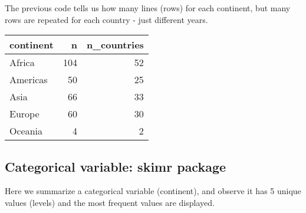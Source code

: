 \documentclass[]{book}
\newenvironment{Shaded}{\begin{snugshade}}{\end{snugshade}}
\newcommand{\KeywordTok}[1]{\textcolor[rgb]{0.13,0.29,0.53}{\textbf{#1}}}
\newcommand{\DataTypeTok}[1]{\textcolor[rgb]{0.13,0.29,0.53}{#1}}
\newcommand{\DecValTok}[1]{\textcolor[rgb]{0.00,0.00,0.81}{#1}}
\newcommand{\StringTok}[1]{\textcolor[rgb]{0.31,0.60,0.02}{#1}}
\newcommand{\OperatorTok}[1]{\textcolor[rgb]{0.81,0.36,0.00}{\textbf{#1}}}
\newcommand{\NormalTok}[1]{#1}
\begin{document}
The previous code tells us how many lines (rows) for each continent, but
many rows are repeated for each country - just different years.

\begin{Shaded}
\end{Shaded}

\begin{tabular}{l|r|r}
\hline
continent & n & n\_countries\\
\hline
Africa & 104 & 52\\
\hline
Americas & 50 & 25\\
\hline
Asia & 66 & 33\\
\hline
Europe & 60 & 30\\
\hline
Oceania & 4 & 2\\
\hline
\end{tabular}

\subsection{Categorical variable: skimr
package}\label{categorical-variable-skimr-package}

Here we summarize a categorical variable (continent), and observe it has
5 unique values (levels) and the most frequent values are displayed.

\begin{Shaded}
\end{Shaded}
\end{document}
